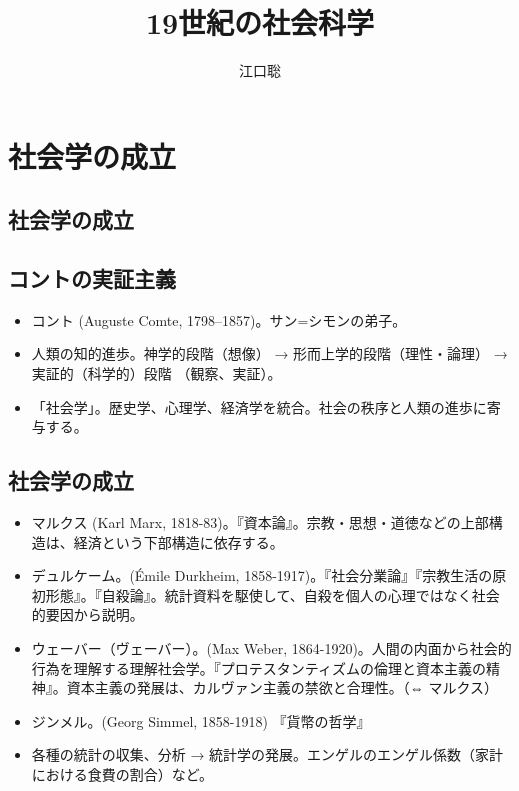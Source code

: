 \documentclass[uplatex,dvipdfmx]{jsarticle}
\author{江口聡}
\title{19世紀の社会科学}
\begin{document}
\maketitle
\else\chapter{社会学の成立}\fi



\label{cha:19century}


\section{社会学の成立}

\section{コントの実証主義}

\begin{itemize}
\item コント (Auguste Comte, 1798--1857)。サン=シモンの弟子。
\item 人類の知的進歩。神学的段階（想像） → 形而上学的段階（理性・論理） → 実証的（科学的）段階 （観察、実証）。
\item 「社会学」。歴史学、心理学、経済学を統合。社会の秩序と人類の進歩に寄与する。
\end{itemize}



\section{社会学の成立}
\begin{itemize}
\item マルクス (Karl Marx, 1818-83)。『資本論』。宗教・思想・道徳などの上部構造は、経済という下部構造に依存する。
\item デュルケーム。(\'{E}mile Durkheim, 1858-1917)。『社会分業論』『宗教生活の原初形態』。『自殺論』。統計資料を駆使して、自殺を個人の心理ではなく社会的要因から説明。
\item ウェーバー（ヴェーバー）。(Max Weber, 1864-1920)。人間の内面から社会的行為を理解する理解社会学。『プロテスタンティズムの倫理と資本主義の精神』。資本主義の発展は、カルヴァン主義の禁欲と合理性。（⇔ マルクス）
\item ジンメル。(Georg Simmel, 1858-1918) 『貨幣の哲学』
\item 各種の統計の収集、分析 → 統計学の発展。エンゲルのエンゲル係数（家計における食費の割合）など。
\end{itemize}






\ifx\mybook\undefined
  

\end{document}
